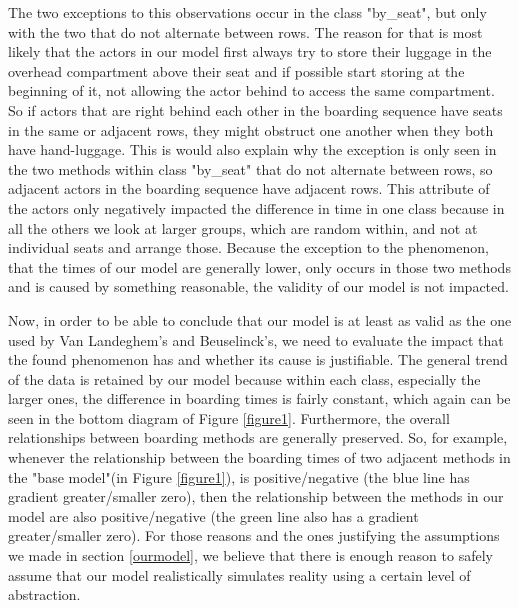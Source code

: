 \documentclass[11pt]{article}
\begin{document}
The two exceptions to this observations occur in the class "by\_seat", but only with the two that do not alternate between rows. The reason for that is most likely that the actors in our model first always try to store their luggage in the overhead compartment above their seat and if possible start storing at the beginning of it, not allowing the actor behind to access the same compartment. So if actors that are right behind each other in the boarding sequence have seats in the same or adjacent rows, they might obstruct one another when they both have hand-luggage. This is would also explain why the exception is only seen in the two methods within class "by\_seat" that do not alternate between rows, so adjacent actors in the boarding sequence have adjacent rows. This attribute of the actors only negatively impacted the difference in time in one class because in all the others we look at larger groups, which are random within, and not at individual seats and arrange those. Because the exception to the phenomenon, that the times of our model are generally lower, only occurs in those two methods and is caused by something reasonable, the validity of our model is not impacted. 

Now, in order to be able to conclude that our model is at least as valid as the one used by Van Landeghem's and Beuselinck's, we need to evaluate the impact that the found phenomenon has and whether its cause is justifiable. 
The general trend of the data is retained by our model because within each class, especially the larger ones, the difference in boarding times is fairly constant, which again can be seen in the bottom diagram of Figure \ref{figure1}. Furthermore, the overall relationships between boarding methods are generally preserved. So, for example, whenever the relationship between the boarding times of two adjacent methods in the "base model"(in Figure \ref{figure1}), is positive/negative (the blue line has gradient greater/smaller zero), then the relationship between the methods in our model are also positive/negative (the green line also has a gradient greater/smaller zero). For those reasons and the ones justifying the assumptions we made in section \ref{ourmodel}, we believe that there is enough reason to safely assume that our model realistically simulates reality using a certain level of abstraction.  
\end{document}
